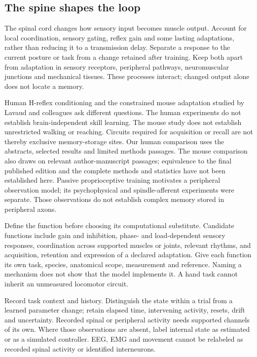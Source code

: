 \subsection{The spine shapes the loop}

The spinal cord changes how sensory input becomes muscle output. Account for
local coordination, sensory gating, reflex gain and some lasting adaptations,
rather than reducing it to a transmission delay. Separate a response to the
current posture or task from a change retained after training. Keep both apart
from adaptation in sensory receptors, peripheral pathways, neuromuscular
junctions and mechanical tissues. These processes interact; changed output alone
does not locate a memory.

Human H-reflex conditioning and the constrained mouse adaptation studied by
Lavaud and colleagues ask different questions.\cite{thompson2009retained,thompson2013retained,lavaud2024}
The human experiments do not establish brain-independent skill learning. The
mouse study does not establish unrestricted walking or reaching. Circuits
required for acquisition or recall are not thereby exclusive memory-storage
sites. Our human comparison uses the abstracts, selected results and limited
methods passages. The mouse comparison also draws on relevant author-manuscript
passages; equivalence to the final published edition and the complete methods
and statistics have not been established here. Passive proprioceptive training
motivates a peripheral observation model; its psychophysical and spindle-afferent
experiments were separate.\cite{ackerley2022retained} Those observations do not
establish complex memory stored in peripheral axons.

Define the function before choosing its computational substitute. Candidate
functions include gain and inhibition, phase- and load-dependent sensory
responses, coordination across supported muscles or joints, relevant rhythms,
and acquisition, retention and expression of a declared adaptation. Give each
function its own task, species, anatomical scope, measurement and reference.
Naming a mechanism does not show that the model implements it. A hand task
cannot inherit an unmeasured locomotor circuit.

Record task context and history. Distinguish the state within a trial from a
learned parameter change; retain elapsed time, intervening activity, resets,
drift and uncertainty. Recorded spinal or peripheral activity needs supported
channels of its own. Where those observations are absent, label internal state
as estimated or as a simulated controller. EEG, EMG and movement cannot be
relabeled as recorded spinal activity or identified interneurons.

